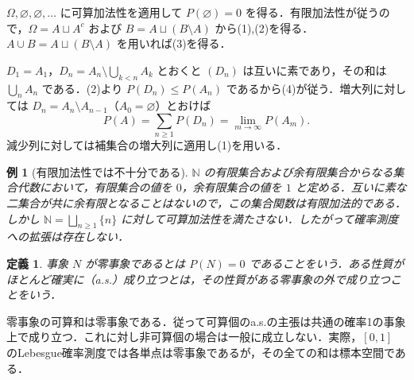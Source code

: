 \documentclass[a5paper,10pt,onecolumn]{jsarticle}
\makeatletter
\theoremstyle{mathnotetheorem}
\newtheorem{definition}[theorem]{定義}
\newtheorem{example}[theorem]{例}
\renewcommand{\proofname}{証明}
\renewenvironment{proof}[1][\proofname]{%
  \par\pushQED{\qed}\normalfont\topsep4\p@\@plus2\p@\relax
  \trivlist\item[\hskip\labelsep\bfseries #1]\ignorespaces
}{\popQED\endtrivlist\@endpefalse}
\newcommand{\N}{\mathbb{N}}
\newcommand{\1}{\mathbf{1}}
\makeatother
\begin{document}
\begin{proof}
$\Omega,\varnothing,\varnothing,\ldots$ に可算加法性を適用して $P(\varnothing)=0$ を得る．有限加法性が従うので，$\Omega=A\sqcup A^c$ および $B=A\sqcup(B\setminus A)$ から(1),(2)を得る．$A\cup B=A\sqcup(B\setminus A)$ を用いれば(3)を得る．

$D_1=A_1$，$D_n=A_n\setminus\bigcup_{k<n}A_k$ とおくと $(D_n)$ は互いに素であり，その和は $\bigcup_nA_n$ である．(2)より $P(D_n)\le P(A_n)$ であるから(4)が従う．増大列に対しては $D_n=A_n\setminus A_{n-1}$（$A_0=\varnothing$）とおけば
\[
 P(A)=\sum_{n\ge1}P(D_n)=\lim_{m\to\infty}P(A_m).
\]
減少列に対しては補集合の増大列に適用し(1)を用いる．
\end{proof}
\begin{example}[有限加法性では不十分である]
$\N$ の有限集合および余有限集合からなる集合代数において，有限集合の値を $0$，余有限集合の値を $1$ と定める．互いに素な二集合が共に余有限となることはないので，この集合関数は有限加法的である．しかし $\N=\bigsqcup_{n\ge1}\{n\}$ に対して可算加法性を満たさない．したがって確率測度への拡張は存在しない．
\end{example}
\begin{definition}
事象 $N$ が零事象であるとは $P(N)=0$ であることをいう．ある性質がほとんど確実に（a.s.）成り立つとは，その性質がある零事象の外で成り立つことをいう．
\end{definition}
零事象の可算和は零事象である．従って可算個のa.s.の主張は共通の確率1の事象上で成り立つ．これに対し非可算個の場合は一般に成立しない．実際，$[0,1]$ のLebesgue確率測度では各単点は零事象であるが，その全ての和は標本空間である．
\end{document}
